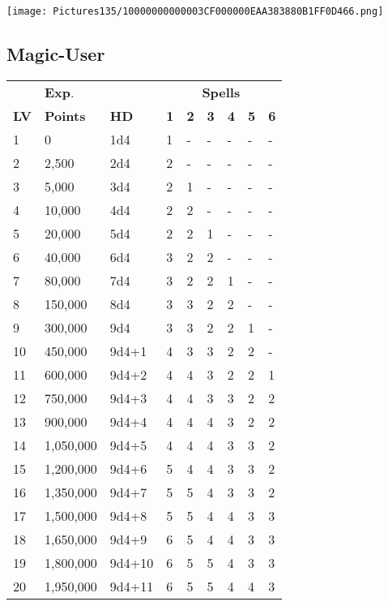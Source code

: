 \documentclass[a4paper,twoside,openany,10pt]{book}
\begin{document}
\begin{multicols}{2}
\addvspace{0.8cm}

\texttt{[image: Pictures135/10000000000003CF000000EAA383880B1FF0D466.png]}


\subsection{Magic-User}\label{magic-user}

\begin{tabular*}{0.93\linewidth}{@{\extracolsep{\fill}}lllllllll}
& \textbf{Exp}. & & \multicolumn{6}{c}{\textbf{Spells}} \\
\textbf{LV} & \textbf{Points} & \textbf{HD} & \textbf{1} & \textbf{2} & \textbf{3} & \textbf{4} & \textbf{5} & \textbf{6} \\\toprule
1 & 0 & 1d4 & 1 & - & - & - & - & - \\\hline
2 & 2,500 & 2d4 & 2 & - & - & - & - & - \\\hline
3 & 5,000 & 3d4 & 2 & 1 & - & - & - & - \\\hline
4 & 10,000 & 4d4 & 2 & 2 & - & - & - & - \\\hline
5 & 20,000 & 5d4 & 2 & 2 & 1 & - & - & - \\\hline
6 & 40,000 & 6d4 & 3 & 2 & 2 & - & - & - \\\hline
7 & 80,000 & 7d4 & 3 & 2 & 2 & 1 & - & - \\\hline
8 & 150,000 & 8d4 & 3 & 3 & 2 & 2 & - & - \\\hline
9 & 300,000 & 9d4 & 3 & 3 & 2 & 2 & 1 & - \\\hline
10 & 450,000 & 9d4+1 & 4 & 3 & 3 & 2 & 2 & - \\\hline
11 & 600,000 & 9d4+2 & 4 & 4 & 3 & 2 & 2 & 1 \\\hline
12 & 750,000 & 9d4+3 & 4 & 4 & 3 & 3 & 2 & 2 \\\hline
13 & 900,000 & 9d4+4 & 4 & 4 & 4 & 3 & 2 & 2 \\\hline
14 & 1,050,000 & 9d4+5 & 4 & 4 & 4 & 3 & 3 & 2 \\\hline
15 & 1,200,000 & 9d4+6 & 5 & 4 & 4 & 3 & 3 & 2 \\\hline
16 & 1,350,000 & 9d4+7 & 5 & 5 & 4 & 3 & 3 & 2 \\\hline
17 & 1,500,000 & 9d4+8 & 5 & 5 & 4 & 4 & 3 & 3 \\\hline
18 & 1,650,000 & 9d4+9 & 6 & 5 & 4 & 4 & 3 & 3 \\\hline
19 & 1,800,000 & 9d4+10 & 6 & 5 & 5 & 4 & 3 & 3 \\\hline
20 & 1,950,000 & 9d4+11 & 6 & 5 & 5 & 4 & 4 & 3 \\\bottomrule
\end{tabular*}\medskip


\end{multicols}
\end{document}
